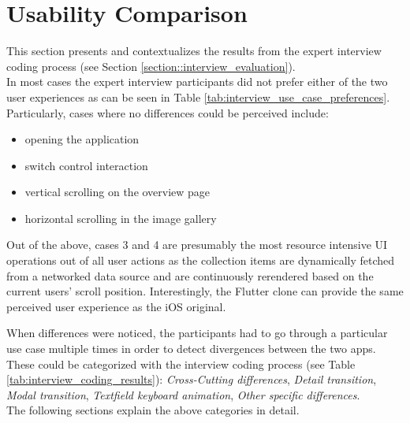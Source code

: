 \section{Usability Comparison} \label{section::usability_comparison}
This section presents and contextualizes the results from the expert interview coding process (see Section \ref{section::interview_evaluation}).\\
In most cases the expert interview participants did not prefer either of the two user experiences as can be seen in Table \ref{tab:interview_use_case_preferences}.
Particularly, cases where no differences could be perceived include:
\begin{itemize}
    \item opening the application
    \item switch control interaction
    \item vertical scrolling on the overview page
    \item horizontal scrolling in the image gallery
\end{itemize}
Out of the above, cases 3 and 4 are presumably the most resource intensive UI operations out of all user actions as the collection items are dynamically fetched from a networked data source and are continuously rerendered based on the current users' scroll position.
Interestingly, the Flutter clone can provide the same perceived user experience as the iOS original.

When differences were noticed, the participants had to go through a particular use case multiple times in order to detect divergences between the two apps.
These could be categorized with the interview coding process (see Table \ref{tab:interview_coding_results}): \textit{Cross-Cutting differences}, \textit{Detail transition}, \textit{Modal transition}, \textit{Textfield keyboard animation}, \textit{Other specific differences}.\\
The following sections explain the above categories in detail.

\begin{table}[!htp]\centering
    \caption{Interview Use Case Cumulated Preference Choices}\label{tab:interview_use_case_preferences}
\end{table}




